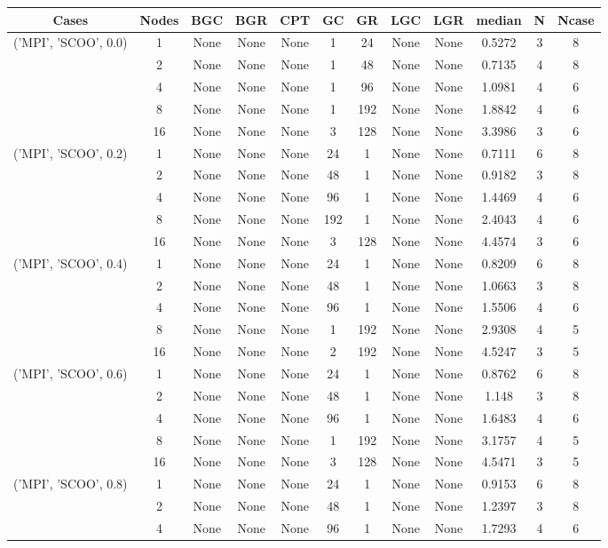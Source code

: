 \begin{tabular}{cccccccccccc}
\hline
Cases & Nodes& BGC& BGR& CPT& GC& GR& LGC& LGR& median & N & Ncase \\
\hline
\multirow{5}{*}{('MPI', 'SCOO', 0.0)}& 1& None& None& None& 1& 24& None& None& 0.5272& 3& 8\\
& 2& None& None& None& 1& 48& None& None& 0.7135& 4& 8\\
& 4& None& None& None& 1& 96& None& None& 1.0981& 4& 6\\
& 8& None& None& None& 1& 192& None& None& 1.8842& 4& 6\\
& 16& None& None& None& 3& 128& None& None& 3.3986& 3& 6\\
\hline
\multirow{5}{*}{('MPI', 'SCOO', 0.2)}& 1& None& None& None& 24& 1& None& None& 0.7111& 6& 8\\
& 2& None& None& None& 48& 1& None& None& 0.9182& 3& 8\\
& 4& None& None& None& 96& 1& None& None& 1.4469& 4& 6\\
& 8& None& None& None& 192& 1& None& None& 2.4043& 4& 6\\
& 16& None& None& None& 3& 128& None& None& 4.4574& 3& 6\\
\hline
\multirow{5}{*}{('MPI', 'SCOO', 0.4)}& 1& None& None& None& 24& 1& None& None& 0.8209& 6& 8\\
& 2& None& None& None& 48& 1& None& None& 1.0663& 3& 8\\
& 4& None& None& None& 96& 1& None& None& 1.5506& 4& 6\\
& 8& None& None& None& 1& 192& None& None& 2.9308& 4& 5\\
& 16& None& None& None& 2& 192& None& None& 4.5247& 3& 5\\
\hline
\multirow{5}{*}{('MPI', 'SCOO', 0.6)}& 1& None& None& None& 24& 1& None& None& 0.8762& 6& 8\\
& 2& None& None& None& 48& 1& None& None& 1.148& 3& 8\\
& 4& None& None& None& 96& 1& None& None& 1.6483& 4& 6\\
& 8& None& None& None& 1& 192& None& None& 3.1757& 4& 5\\
& 16& None& None& None& 3& 128& None& None& 4.5471& 3& 5\\
\hline
\multirow{5}{*}{('MPI', 'SCOO', 0.8)}& 1& None& None& None& 24& 1& None& None& 0.9153& 6& 8\\
& 2& None& None& None& 48& 1& None& None& 1.2397& 3& 8\\
& 4& None& None& None& 96& 1& None& None& 1.7293& 4& 6\\

\end{tabular}

